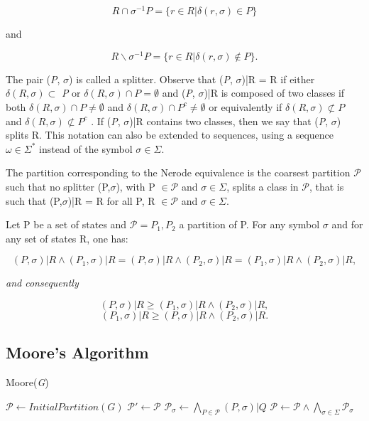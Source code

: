 {\[
R\cap\sigma^{-1}P = \{r \in R | \delta(r,\sigma) \in P\}
\]

\noindent and

\[
R\backslash\sigma^{-1}P = \{r \in R | \delta(r,\sigma) \notin P\}.
\]

The pair (\textit{P}, $\sigma$) is called a splitter. Observe that (\textit{P}, $\sigma$)|R = {R} if either $\delta(R,\sigma) \subset$ \textit{P}
or $\delta(R,\sigma)\cap P = \emptyset$ and (\textit{P}, $\sigma$)|R is composed of two classes if both $\delta(R,\sigma)\cap P  \neq\emptyset$ and
$\delta(R,\sigma)\cap P^c  \neq \emptyset$  or equivalently if $\delta(R,\sigma) \not\subset P $   and  $\delta(R,\sigma)\not\subset P^c $ . If (\textit{P}, $\sigma$)|R  contains two
classes, then we say that (\textit{P}, $\sigma$) splits R. This notation can also be extended to sequences, using a sequence $\omega \in \Sigma^*$ instead of the symbol $\sigma \in \Sigma$.

\begin{proposition}\label{prop:nerequiv}
The partition corresponding to the Nerode equivalence is the coarsest partition $\mathcal{P}$ such that no splitter (P,$\sigma$), with P $\in \mathcal{P}$ and $\sigma \in \Sigma$, splits a class in $\mathcal{P}$, that is such that (P,$\sigma$)|R = {R} for all P, R $\in \mathcal{P}$ and $\sigma \in \Sigma$.
\end{proposition}

\begin{lemma}\label{lemm:hopcrof}
Let P be a set of states and $\mathcal{P} = {P_1, P_2}$ a partition of P. For any symbol $\sigma$ and for any set of states R, one has:
\end{lemma}
 

\[
(P,\sigma)|R \wedge (P_1, \sigma)|R = (P, \sigma)|R \wedge (P_2, \sigma)|R = (P_1,\sigma)|R \wedge (P_2,\sigma)|R,
\]

\textit{and consequently}

\[
(P,\sigma)|R \geqslant (P_1,\sigma)|R \wedge (P_2,\sigma)|R,
\]
\[
(P_1,\sigma)|R \geqslant (P,\sigma)|R \wedge (P_2,\sigma)|R.
\]
\subsection{Moore's Algorithm}

\begin{algorithm} 
  \caption{Moore(\textit{G})\label{alg:moore}}
    \begin{algorithmic}[1]
      \State $\mathcal{P} \leftarrow InitialPartition(G)$
      \Repeat
      	\State $\mathcal{P}' \leftarrow \mathcal{P}$
      	\ForAll{$\sigma \in \Sigma$}
      		\State $\mathcal{P}_{\sigma} \leftarrow \bigwedge_{P\in \mathcal{P}}(P,\sigma)|Q$
      	\EndFor
      	\State $\mathcal{P} \leftarrow \mathcal{P}\wedge\bigwedge_{\sigma\in\Sigma}\mathcal{P}_{\sigma}$
    \end{algorithmic}
  \end{algorithm}
 
}
